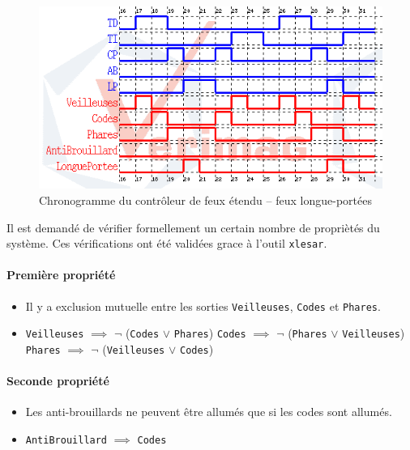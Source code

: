 \documentclass{article}
\begin{document}
      \begin{figure}
        \centering
        \includegraphics[scale=0.5]{img/chrono2_feux-ext.png}
        \caption{Chronogramme du contrôleur de feux étendu -- feux longue-portées}
        \label{fig:chrono2_feux-ext}
      \end{figure}

      Il est demandé de vérifier formellement un certain nombre de propriètés du
      système. Ces vérifications ont été validées grace à l'outil {\tt xlesar}. 

      \paragraph{Première propriété}
        \begin{itemize}
          \item[] Il y a exclusion mutuelle entre les sorties {\tt Veilleuses}, {\tt Codes}
            et {\tt Phares}.
          \item[] \noindent
            {\tt Veilleuses} $\implies$ $\lnot$ ({\tt Codes} $\lor$ {\tt Phares}) \newline
            {\tt Codes} $\implies$ $\lnot$ ({\tt Phares} $\lor$ {\tt Veilleuses}) \newline
            {\tt Phares} $\implies$ $\lnot$ ({\tt Veilleuses} $\lor$ {\tt Codes}) \medskip
        \end{itemize}

      \paragraph{Seconde propriété}
        \begin{itemize}
          \item[] Les anti-brouillards ne peuvent être allumés que si les codes
            sont allumés.
          \item[] \noindent
            {\tt AntiBrouillard} $\implies$ {\tt Codes}
        \end{itemize}
\end{document}
